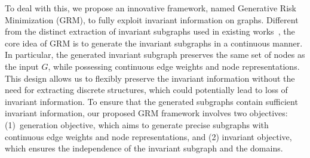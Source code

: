 To deal with this, we propose an innovative framework, named Generative Risk Minimization (GRM), to fully exploit invariant information on graphs.  Different from the distinct extraction of invariant subgraphs used in existing works~\citep{chen2023does,
chen2022learning}, the core idea of GRM is
to generate the invariant subgraphs in a continuous manner. 
In particular, the generated invariant subgraph preserves the same set of nodes as the input $G$, while possessing continuous edge weights and node representations. 
This design allows us to flexibly preserve the invariant information without the need for extracting discrete structures, which could potentially lead to loss of invariant information. To ensure that the generated subgraphs contain sufficient invariant information, our proposed GRM framework involves two objectives: (1)~generation objective, which aims to generate precise subgraphs with continuous edge weights and node representations, and (2) invariant objective, which ensures the independence of the invariant subgraph and the domains.

